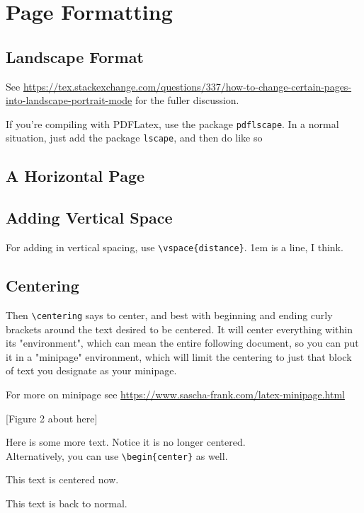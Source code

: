 \section{Page Formatting}

\subsection{Landscape Format}
See \url{https://tex.stackexchange.com/questions/337/how-to-change-certain-pages-into-landscape-portrait-mode} for the fuller discussion.

If you're compiling with PDFLatex, use the package \verb+pdflscape+. In a normal situation, just add the package \verb+lscape+, and then do like so

\begin{landscape}


\section{A Horizontal Page}

\end{landscape}

\subsection{Adding Vertical Space}
For adding in vertical spacing, use \verb+\vspace{distance}+. 1em is a line, I think.

\subsection{Centering}
Then \verb+\centering+ says to center, and best with beginning and ending curly brackets around the text desired to be centered. It will center everything within its "environment", which can mean the entire following document, so you can put it in a "minipage" environment, which will limit the centering to just that block of text you designate as your minipage.

For more on minipage see \url{https://www.sascha-frank.com/latex-minipage.html}

\noindent
\begin{minipage}{\textwidth} %
\centering
\vspace{1em}
[Figure 2 about here]
\vspace{1em}

\end{minipage}

\noindent
Here is some more text. Notice it is no longer centered.\\


Alternatively, you can use \verb+\begin{center}+ as well. 

\begin{center}
\vspace{1em}
This text is centered now.
\vspace{1em}
\end{center}

\noindent
This text is back to normal. 

